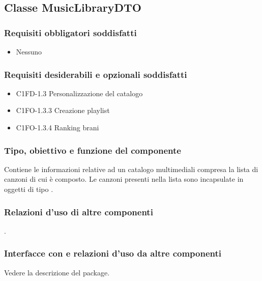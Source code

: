 \subsection{Classe MusicLibraryDTO}
\subsubsection*{Requisiti obbligatori soddisfatti}
\begin{itemize}
    \item Nessuno
\end{itemize}
\subsubsection*{Requisiti desiderabili e opzionali soddisfatti}
\begin{itemize}
    \item C1FD-1.3 Personalizzazione del catalogo
    \item C1FO-1.3.3 Creazione playlist
    \item C1FO-1.3.4 Ranking brani
\end{itemize}
\subsubsection*{Tipo, obiettivo e funzione del componente}
Contiene le informazioni relative ad un catalogo multimediali compresa la lista
di canzoni di cui \`e composto. Le canzoni presenti nella lista sono incapsulate
in oggetti di tipo .
\subsubsection*{Relazioni d'uso di altre componenti} 
.
\subsubsection*{Interfacce con e relazioni d'uso da altre componenti}
Vedere la descrizione del package.
